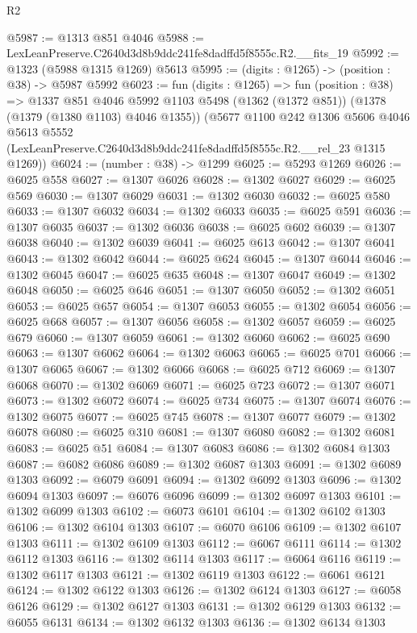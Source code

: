 \begin{lexlean}{R2}
\begin{coremodule}
@5987 := @1313 @851 @4046
@5988 := LexLeanPreserve.C2640d3d8b9ddc241fe8dadffd5f8555c.R2.__fits_19
@5992 := @1323 (@5988 @1315 @1269) @5613
@5995 := (digits : @1265) -> (position : @38) -> @5987 @5992
@6023 := fun (digits : @1265) =>
  fun (position : @38) =>
  @1337
    @851
    @4046
    @5992
    @1103
    @5498
    (@1362 (@1372 @851))
    (@1378 (@1379 (@1380 @1103) @4046 @1355))
    (@5677
      @1100
      @242
      @1306
      @5606
      @4046
      @5613
      @5552
      (LexLeanPreserve.C2640d3d8b9ddc241fe8dadffd5f8555c.R2.__rel_23 @1315 @1269))
@6024 := (number : @38) -> @1299
@6025 := @5293 @1269
@6026 := @6025 @558
@6027 := @1307 @6026
@6028 := @1302 @6027
@6029 := @6025 @569
@6030 := @1307 @6029
@6031 := @1302 @6030
@6032 := @6025 @580
@6033 := @1307 @6032
@6034 := @1302 @6033
@6035 := @6025 @591
@6036 := @1307 @6035
@6037 := @1302 @6036
@6038 := @6025 @602
@6039 := @1307 @6038
@6040 := @1302 @6039
@6041 := @6025 @613
@6042 := @1307 @6041
@6043 := @1302 @6042
@6044 := @6025 @624
@6045 := @1307 @6044
@6046 := @1302 @6045
@6047 := @6025 @635
@6048 := @1307 @6047
@6049 := @1302 @6048
@6050 := @6025 @646
@6051 := @1307 @6050
@6052 := @1302 @6051
@6053 := @6025 @657
@6054 := @1307 @6053
@6055 := @1302 @6054
@6056 := @6025 @668
@6057 := @1307 @6056
@6058 := @1302 @6057
@6059 := @6025 @679
@6060 := @1307 @6059
@6061 := @1302 @6060
@6062 := @6025 @690
@6063 := @1307 @6062
@6064 := @1302 @6063
@6065 := @6025 @701
@6066 := @1307 @6065
@6067 := @1302 @6066
@6068 := @6025 @712
@6069 := @1307 @6068
@6070 := @1302 @6069
@6071 := @6025 @723
@6072 := @1307 @6071
@6073 := @1302 @6072
@6074 := @6025 @734
@6075 := @1307 @6074
@6076 := @1302 @6075
@6077 := @6025 @745
@6078 := @1307 @6077
@6079 := @1302 @6078
@6080 := @6025 @310
@6081 := @1307 @6080
@6082 := @1302 @6081
@6083 := @6025 @51
@6084 := @1307 @6083
@6086 := @1302 @6084 @1303
@6087 := @6082 @6086
@6089 := @1302 @6087 @1303
@6091 := @1302 @6089 @1303
@6092 := @6079 @6091
@6094 := @1302 @6092 @1303
@6096 := @1302 @6094 @1303
@6097 := @6076 @6096
@6099 := @1302 @6097 @1303
@6101 := @1302 @6099 @1303
@6102 := @6073 @6101
@6104 := @1302 @6102 @1303
@6106 := @1302 @6104 @1303
@6107 := @6070 @6106
@6109 := @1302 @6107 @1303
@6111 := @1302 @6109 @1303
@6112 := @6067 @6111
@6114 := @1302 @6112 @1303
@6116 := @1302 @6114 @1303
@6117 := @6064 @6116
@6119 := @1302 @6117 @1303
@6121 := @1302 @6119 @1303
@6122 := @6061 @6121
@6124 := @1302 @6122 @1303
@6126 := @1302 @6124 @1303
@6127 := @6058 @6126
@6129 := @1302 @6127 @1303
@6131 := @1302 @6129 @1303
@6132 := @6055 @6131
@6134 := @1302 @6132 @1303
@6136 := @1302 @6134 @1303

\end{coremodule}
\end{lexlean}
